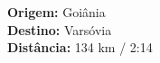 \documentclass[preview]{standalone}
\begin{document}
\begin{center}
\textbf{Origem:} Goiânia \\
            \textbf{Destino:} Varsóvia \\
            \textbf{Distância:} 134 km / 2:14 \\
\end{center}
\end{document}
